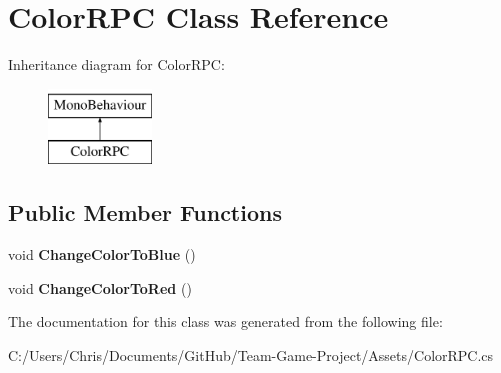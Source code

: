 \hypertarget{class_color_r_p_c}{}\section{Color\+R\+PC Class Reference}
\label{class_color_r_p_c}
Inheritance diagram for Color\+R\+PC\+:\begin{figure}[H]
\begin{center}
\leavevmode
\includegraphics[height=2.000000cm]{class_color_r_p_c}
\end{center}
\end{figure}
\subsection*{Public Member Functions}
\begin{DoxyCompactItemize}
\item 
void {\bfseries Change\+Color\+To\+Blue} ()\hypertarget{class_color_r_p_c_a70e9b67d9b24202c3ce1cb32f86f53be}{}\label{class_color_r_p_c_a70e9b67d9b24202c3ce1cb32f86f53be}

\item 
void {\bfseries Change\+Color\+To\+Red} ()\hypertarget{class_color_r_p_c_a6d4ecccf04e03bd29e0df5489143c57b}{}\label{class_color_r_p_c_a6d4ecccf04e03bd29e0df5489143c57b}

\end{DoxyCompactItemize}


The documentation for this class was generated from the following file\+:\begin{DoxyCompactItemize}
\item 
C\+:/\+Users/\+Chris/\+Documents/\+Git\+Hub/\+Team-\/\+Game-\/\+Project/\+Assets/Color\+R\+P\+C.\+cs\end{DoxyCompactItemize}
